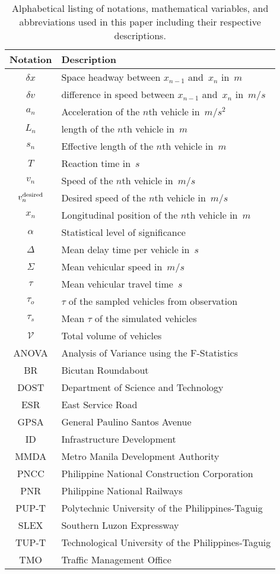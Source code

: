 \documentclass[preprint]{./acm_proc_article-sp}
\begin{document}
\begin{table*}[hbt]
\caption{Alphabetical listing of notations, mathematical variables, and abbreviations used in this paper including their respective descriptions.}\label{tab:notations}
\centering\begin{tabular}{cl}
\hline\hline
Notation & Description\\
\hline
$\delta x$ & Space headway between $x_{n-1}$ and~$x_n$ in~$m$\\
$\delta v$ & difference in speed between $x_{n-1}$ and~$x_n$ in~$m/s$\\
$a_n$ & Acceleration of the $n$th vehicle in~$m/s^2$\\
$L_n$ & length of the $n$th vehicle in~$m$\\
$s_n$ & Effective length of the $n$th vehicle in~$m$\\
$T$   & Reaction time in~$s$\\
$v_n$ & Speed of the $n$th vehicle in~$m/s$\\
$v_n^{\rm desired}$ & Desired speed of the $n$th vehicle in~$m/s$\\
$x_n$ & Longitudinal position of the $n$th vehicle in~$m$\\
\hline
$\alpha$ & Statistical level of significance\\
$\Delta$ & Mean delay time per vehicle in~$s$\\
$\Sigma$ & Mean vehicular speed in~$m/s$\\
$\tau$   & Mean vehicular travel time~$s$\\
$\tau_o$ & $\tau$ of the sampled vehicles from observation\\
$\tau_s$ & Mean $\tau$ of the simulated vehicles\\
$\mathcal{V}$ & Total volume of vehicles\\
\hline
ANOVA    & Analysis of Variance using the F-Statistics\\
BR      & Bicutan Roundabout\\
DOST    & Department of Science and Technology\\
ESR     & East Service Road\\
GPSA    & General Paulino Santos Avenue\\
ID      & Infrastructure Development\\
MMDA    & Metro Manila Development Authority\\
PNCC    & Philippine National Construction Corporation\\
PNR     & Philippine National Railways\\
PUP-T   & Polytechnic University of the Philippines-Taguig\\
SLEX    & Southern Luzon Expressway\\
TUP-T   & Technological University of the Philippines-Taguig\\
TMO     & Traffic Management Office\\
\hline\hline
\end{tabular}
\end{table*}
\end{document}

